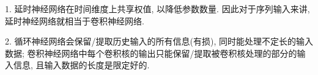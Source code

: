 \documentclass{subfiles}
\begin{document}
1. 延时神经网络在时间维度上共享权值, 以降低参数数量.
因此对于序列输入来讲, 延时神经网络就相当于卷积神经网络.

2. 循环神经网络会保留/提取历史输入的所有信息(有损), 同时能处理不定长的输入数据;
卷积神经网络中每个卷积核的输出只能保留/提取被卷积核处理的部分的输入信息, 且输入数据的长度是限定好的.
\end{document}
